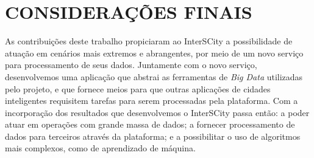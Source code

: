 \chapter{CONSIDERAÇÕES FINAIS}
\label{chapter:final}

As contribuições deste trabalho propiciaram ao InterSCity a possibilidade de
atuação em cenários mais extremos e abrangentes, por meio de um novo serviço
para processamento de seus dados. Juntamente com o novo serviço, desenvolvemos
uma aplicação que abstrai as ferramentas de \textit{Big Data} utilizadas pelo
projeto, e que fornece meios para que outras aplicações de cidades inteligentes
requisitem tarefas para serem processadas pela plataforma. Com a incorporação
dos resultados que desenvolvemos o InterSCity passa então: a poder atuar em
operações com grande massa de dados; a fornecer processamento de dados para
terceiros através da plataforma; e a possibilitar o uso de algoritmos mais
complexos, como de aprendizado de máquina.

